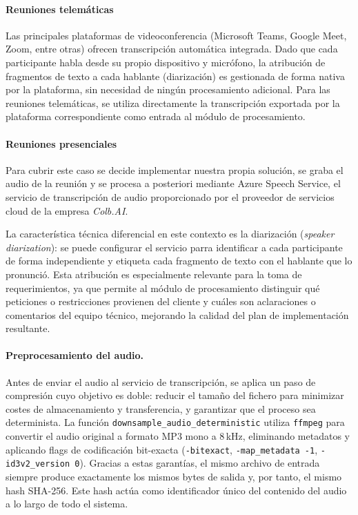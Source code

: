 \documentclass[11pt, letterpaper]{article}
\begin{document}
\paragraph{Reuniones telemáticas}
\label{sec:reuniones_telematicas}
Las principales plataformas de videoconferencia (Microsoft Teams, Google Meet, Zoom, entre otras) ofrecen transcripción automática integrada. Dado que cada participante habla desde su propio dispositivo y micrófono, la atribución de fragmentos de texto a cada hablante (diarización) es gestionada de forma nativa por la plataforma, sin necesidad de ningún procesamiento adicional. Para las reuniones telemáticas, se utiliza directamente la transcripción exportada por la plataforma correspondiente como entrada al módulo de procesamiento.

\paragraph{Reuniones presenciales}
\label{sec:reuniones_presenciales}
Para cubrir este caso se decide implementar nuestra propia solución, se graba el audio de la reunión y se procesa a posteriori mediante Azure Speech Service, el servicio de transcripción de audio proporcionado por el proveedor de servicios cloud de la empresa \textit{Colb.AI}.

La característica técnica diferencial en este contexto es la diarización (\textit{speaker diarization}): se puede configurar el servicio parra identificar a cada participante de forma independiente y etiqueta cada fragmento de texto con el hablante que lo pronunció. Esta atribución es especialmente relevante para la toma de requerimientos, ya que permite al módulo de procesamiento distinguir qué peticiones o restricciones provienen del cliente y cuáles son aclaraciones o comentarios del equipo técnico, mejorando la calidad del plan de implementación resultante.

\paragraph{Preprocesamiento del audio.}
Antes de enviar el audio al servicio de transcripción, se aplica un paso de compresión cuyo objetivo es doble: reducir el tamaño del fichero para minimizar costes de almacenamiento y transferencia, y garantizar que el proceso sea determinista. La función \texttt{downsample\_audio\_deterministic} utiliza \texttt{ffmpeg} para convertir el audio original a formato MP3 mono a 8\,kHz, eliminando metadatos y aplicando flags de codificación bit-exacta (\texttt{-bitexact}, \texttt{-map\_metadata -1}, \texttt{-id3v2\_version 0}). Gracias a estas garantías, el mismo archivo de entrada siempre produce exactamente los mismos bytes de salida y, por tanto, el mismo hash SHA-256. Este hash actúa como identificador único del contenido del audio a lo largo de todo el sistema.
\end{document}
